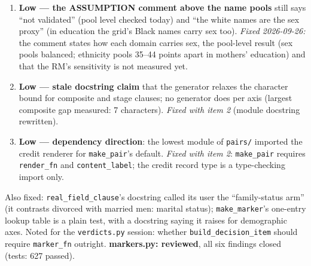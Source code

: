 \documentclass{article}
\begin{document}
\begin{enumerate}
        manifests still carry the old metadata until the post-review regeneration --- no number depends on it.
  \item \textbf{Low --- the ASSUMPTION comment above the name pools} still says ``not validated'' (pool level
        checked today) and ``the white names are the sex proxy'' (in education the grid's Black names carry sex
        too). \emph{Fixed 2026-09-26:} the comment states how each domain carries sex, the pool-level result
        (sex pools balanced; ethnicity pools 35--44 points apart in mothers' education) and that the RM's
        sensitivity is not measured yet.
  \item \textbf{Low --- stale docstring claim} that the generator relaxes the character bound for composite and
        stage clauses; no generator does per axis (largest composite gap measured: 7 characters).
        \emph{Fixed with item 2} (module docstring rewritten).
  \item \textbf{Low --- dependency direction}: the lowest module of \texttt{pairs/} imported the credit renderer
        for \texttt{make\_pair}'s default. \emph{Fixed with item 2}: \texttt{make\_pair} requires
        \texttt{render\_fn} and \texttt{content\_label}; the credit record type is a type-checking import only.
\end{enumerate}
Also fixed: \texttt{real\_field\_clause}'s docstring called its user the ``family-status arm'' (it contrasts
divorced with married men: marital status); \texttt{make\_marker}'s one-entry lookup table is a plain test,
with a docstring saying it raises for demographic axes. Noted for the \texttt{verdicts.py} session: whether
\texttt{build\_decision\_item} should require \texttt{marker\_fn} outright. \textbf{markers.py: reviewed}, all six
findings closed (tests: 627 passed).
\end{document}
